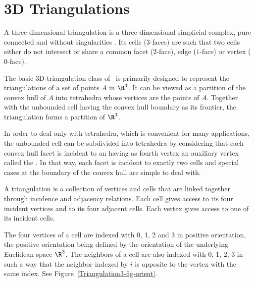 

\chapter{3D Triangulations}

A three-dimensional triangulation is a three-dimensional simplicial
complex, pure connected and without singularities \cite{by-ag-98}. Its
cells ($3$-faces) are such that two cells either do not intersect or
share a common facet ($2$-face), edge ($1$-face) or vertex ($0$-face).

The basic 3D-triangulation class of \cgal\ is primarily designed to
represent the triangulations of a set of points $A$ in $\R^3$.  It can
be viewed as a partition of the convex hull of {$A$} into tetrahedra
whose vertices are the points of {$A$}.  Together with the unbounded
cell having the convex hull boundary as its frontier, the triangulation
forms a partition of $\R^3$.

In order to deal
only with tetrahedra, which is convenient for many applications, the
unbounded cell can be subdivided into tetrahedra by considering that
each convex hull facet is incident to an  having as
fourth vertex an auxiliary vertex called the .  In
that way, each facet is incident to exactly two cells and special cases
at the boundary of the convex hull are simple to deal with.


A triangulation is a collection of vertices and cells that are linked
together through incidence and adjacency relations. Each cell gives
access to its four incident vertices and to its four adjacent
cells. Each vertex gives access to one of its incident cells.

The four vertices of a cell are indexed with 0, 1, 2 and 3 in positive
orientation, the positive orientation being defined by the orientation
of the underlying Euclidean space $\R^3$. The neighbors of a cell are also
indexed with 0, 1, 2, 3 in such a way that the neighbor indexed by $i$
is opposite to the vertex with the same index. See
Figure~\ref{Triangulation3-fig-orient}.



